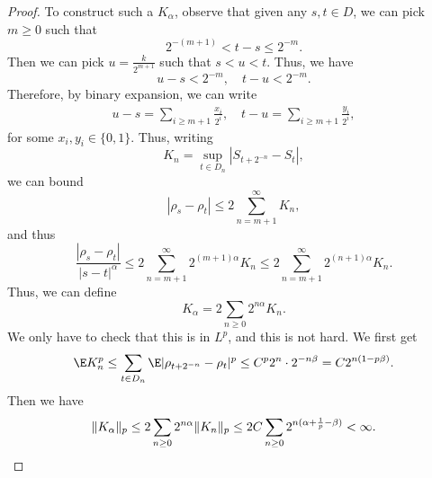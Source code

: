 \documentclass[a4paper]{article}
\begin{document}
\begin{proof}
  To construct such a $K_\alpha$, observe that given any $s, t \in D$, we can pick $m \geq 0$ such that
  \[
    2^{-(m+1)} < t - s \leq 2^{-m}.
  \]
  Then we can pick $u = \frac{k}{2^{m + 1}}$ such that $s < u < t$. Thus, we have
  \[
    u - s < 2^{-m},\quad t - u < 2^{-m}.
  \]
  Therefore, by binary expansion, we can write
  \begin{align*}
    u - s = \sum_{i \geq m + 1} \frac{x_i}{2^i},\quad t - u = \sum_{i \geq m + 1} \frac{y_i}{2^i},
  \end{align*}
  for some $x_i, y_i \in \{0, 1\}$. Thus, writing
  \[
    K_n = \sup_{t \in D_n} |S_{t + 2^{-n}} - S_t|,
  \]
  we can bound
  \[
    |\rho_s - \rho_t| \leq 2 \sum_{n = m + 1}^\infty K_n,
  \]
  and thus
  \[
    \frac{|\rho_s - \rho_t|}{|s - t|^\alpha} \leq 2 \sum_{n = m + 1}^\infty 2^{(m + 1) \alpha} K_n \leq 2 \sum_{n = m + 1}^\infty 2^{(n + 1) \alpha} K_n.
  \]
  Thus, we can define
  \[
    K_\alpha = 2 \sum_{n \geq 0} 2^{n\alpha} K_n.
  \]
  We only have to check that this is in $L^p$, and this is not hard. We first get
  \[
    \E K_n^p \leq \sum_{t \in D_n} \E |\rho_{t + 2^{-n}} - \rho_t|^p \leq C^p 2^n \cdot 2^{-n \beta} = C 2^{n(1 - p\beta)}.
  \]
  Then we have
  \[
    \|K_\alpha\|_p \leq 2 \sum_{n \geq 0}2^{n\alpha} \|K_n\|_p \leq  2C \sum_{n \geq 0} 2^{n(\alpha + \frac{1}{p} - \beta)} < \infty.\qedhere
  \]
%
\end{proof}
\end{document}
